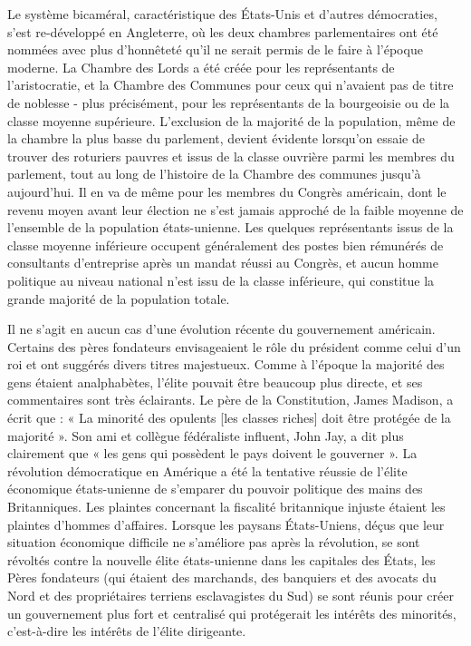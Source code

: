 Le système bicaméral, caractéristique des États-Unis et d'autres démocraties, s'est re-développé en Angleterre, où les deux chambres parlementaires ont été nommées avec plus d'honnêteté qu'il ne serait permis de le faire à l'époque moderne. La Chambre des Lords a été créée pour les représentants de l'aristocratie, et la Chambre des Communes pour ceux qui n'avaient pas de titre de noblesse - plus précisément, pour les représentants de la bourgeoisie ou de la classe moyenne supérieure. L'exclusion de la majorité de la population, même de la chambre la plus basse du parlement, devient évidente lorsqu'on essaie de trouver des roturiers pauvres et issus de la classe ouvrière parmi les membres du parlement, tout au long de l'histoire de la Chambre des communes jusqu'à aujourd'hui. Il en va de même pour les membres du Congrès américain, dont le revenu moyen avant leur élection ne s'est jamais approché de la faible moyenne de l'ensemble de la population états-unienne. Les quelques représentants issus de la classe moyenne inférieure occupent généralement des postes bien rémunérés de consultants d'entreprise après un mandat réussi au Congrès, et aucun homme politique au niveau national n'est issu de la classe inférieure, qui constitue la grande majorité de la population totale.

Il ne s'agit en aucun cas d'une évolution récente du gouvernement américain. Certains des pères fondateurs envisageaient le rôle du président comme celui d'un roi et ont suggérés divers titres majestueux. Comme à l'époque la majorité des gens étaient analphabètes, l'élite pouvait être beaucoup plus directe, et ses commentaires sont très éclairants. Le père de la Constitution, James Madison, a écrit que : « La minorité des opulents {[}les classes riches{]} doit être protégée de la majorité ». Son ami et collègue fédéraliste influent, John Jay, a dit plus clairement que « les gens qui possèdent le pays doivent le gouverner ». La révolution démocratique en Amérique a été la tentative réussie de l'élite économique états-unienne de s'emparer du pouvoir politique des mains des Britanniques. Les plaintes concernant la fiscalité britannique injuste étaient les plaintes d'hommes d'affaires. Lorsque les paysans États-Uniens, déçus que leur situation économique difficile ne s'améliore pas après la révolution, se sont révoltés contre la nouvelle élite états-unienne dans les capitales des États, les Pères fondateurs (qui étaient des marchands, des banquiers et des avocats du Nord et des propriétaires terriens esclavagistes du Sud) se sont réunis pour créer un gouvernement plus fort et centralisé qui protégerait les intérêts des minorités, c'est-à-dire les intérêts de l'élite dirigeante.

